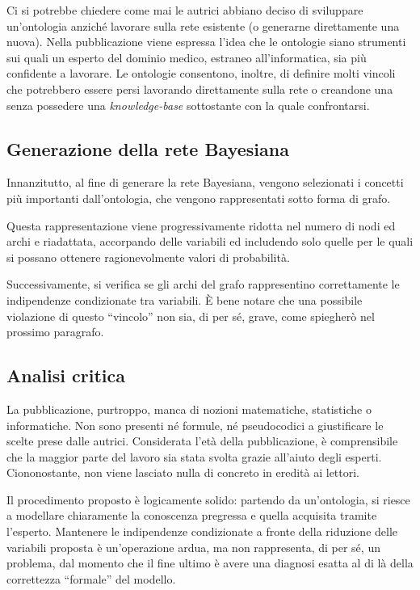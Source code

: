 Ci si potrebbe chiedere come mai le autrici abbiano deciso di sviluppare un'ontologia anziché lavorare sulla rete esistente (o generarne direttamente una nuova). Nella pubblicazione viene espressa l'idea che le ontologie siano strumenti sui quali un esperto del dominio medico, estraneo all'informatica, sia più confidente a lavorare. Le ontologie consentono, inoltre, di definire molti vincoli che potrebbero essere persi lavorando direttamente sulla rete o creandone una senza possedere una \textit{knowledge-base} sottostante con la quale confrontarsi.

\subsection{Generazione della rete Bayesiana}
Innanzitutto, al fine di generare la rete Bayesiana, vengono selezionati i concetti più importanti dall'ontologia, che vengono rappresentati sotto forma di grafo. 

Questa rappresentazione viene progressivamente ridotta nel numero di nodi ed archi e riadattata, accorpando delle variabili ed includendo solo quelle per le quali si possano ottenere ragionevolmente valori di probabilità. 

Successivamente, si verifica se gli archi del grafo rappresentino correttamente le indipendenze condizionate tra variabili. È bene notare che una possibile violazione di questo ``vincolo'' non sia, di per sé, grave, come spiegherò nel prossimo paragrafo.


\subsection{Analisi critica}
La pubblicazione, purtroppo, manca di nozioni matematiche, statistiche o informatiche. Non sono presenti né formule, né pseudocodici a giustificare le scelte prese dalle autrici. Considerata l'età della pubblicazione, è comprensibile che la maggior parte del lavoro sia stata svolta grazie all'aiuto degli esperti. Ciononostante, non viene lasciato nulla di concreto in eredità ai lettori.

Il procedimento proposto è logicamente solido: partendo da un'ontologia, si riesce a modellare chiaramente la conoscenza pregressa e quella acquisita tramite l'esperto. Mantenere le indipendenze condizionate a fronte della riduzione delle variabili proposta è un'operazione ardua, ma non rappresenta, di per sé, un problema, dal momento che il fine ultimo è avere una diagnosi esatta al di là della correttezza ``formale'' del modello.

